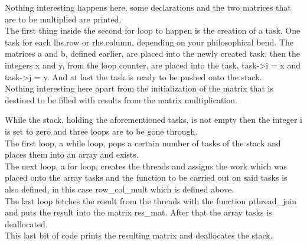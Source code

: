 Nothing interesting happens here, some declarations and the two matrices that
are to be multiplied are printed.\\

The first thing inside the second for loop to happen is the creation of a task.
One task for each lhs.row or rhs.column, depending on your philosophical bend.
The matrices a and b, defined earlier, are placed into the newly created task,
then the integers \textsf{x} and \textsf{y}, from the loop counter, are placed
into the task, \textsf{task->i = x} and \textsf{task->j = y}. And at last the
task is ready to be pushed onto the stack.\\

Nothing interesting here apart from the initialization of the matrix that is
destined to be filled with results from the matrix multiplication.

While the stack, holding the aforementioned tasks, is not empty then the integer
i is set to zero and three loops are to be gone through.\\
The first loop, a while loop, pops a certain number of tasks of the stack and
places them into an array and exists.\\
The next loop, a for loop, creates the threads and assigns the work which was
placed onto the array \textsf{tasks} and the function to be carried out on said
tasks is also defined, in this case \textsf{row\_col\_mult} which is defined
above.\\
The last loop fetches the result from the threads with the function
\textsf{pthread\_join} and puts the result into the matrix \textsf{res\_mat}.
After that the array tasks is deallocated.\\

This last bit of code prints the resulting matrix and deallocates the stack.
